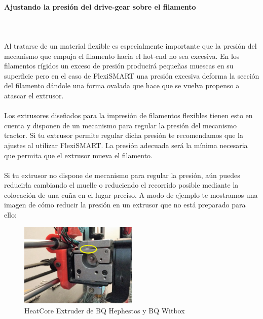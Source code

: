 \documentclass[11pt,a4paper]{article}
\begin{document}
	\paragraph{Ajustando la presión del drive-gear sobre el filamento}\mbox{}\\\\
Al tratarse de un material flexible es especialmente importante que la presión del mecanismo que empuja el filamento hacia el hot-end no sea excesiva. En los filamentos rígidos un exceso de presión producirá pequeñas muescas en su superficie pero en el caso de FlexiSMART una presión excesiva deforma la sección del filamento dándole una forma ovalada que hace que se vuelva propenso a atascar el extrusor.
\\\\
Los extrusores diseñados para la impresión de filamentos flexibles tienen esto en cuenta y disponen de un mecanismo para regular la presión del mecanismo tractor. Si tu extrusor permite regular dicha presión te recomendamos que la ajustes al utilizar FlexiSMART. La presión adecuada será la mínima necesaria que permita que el extrusor mueva el filamento.
\\\\
Si tu extrusor no dispone de mecanismo para regular la presión, aún puedes reducirla cambiando el muelle o reduciendo el recorrido posible mediante la colocación de una cuña en el lugar preciso. A modo de ejemplo te mostramos una imagen de cómo reducir la presión en un extrusor que no está preparado para ello:
\begin{figure}[H]
\centering
\includegraphics[width=0.5\textwidth,cfbox=azul_marcos 4pt 0pt]{FOTOS/SOLUCION1}
\caption*{HeatCore Extruder de BQ Hephestos y BQ Witbox}
\end{figure}
\end{document}
